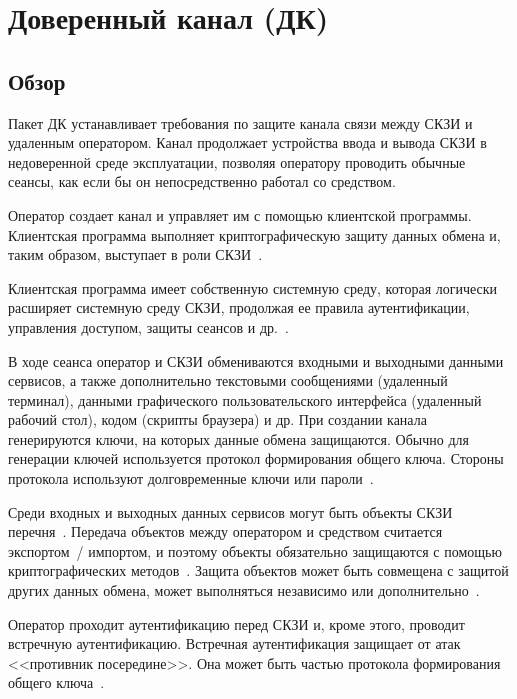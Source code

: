 \section{Доверенный канал (ДК)}\label{TC}

\subsection{Обзор}\label{TC.Intro}

Пакет ДК устанавливает требования по защите канала связи между СКЗИ и 
удаленным оператором. 
%
Канал продолжает устройства ввода и вывода СКЗИ в недоверенной среде 
эксплуатации, позволяя оператору проводить обычные сеансы,
как если бы он непосредственно работал со средством.

Оператор создает канал и управляет им с помощью клиентской программы. 
Клиентская программа выполняет криптографическую защиту данных обмена и, 
таким образом, выступает в роли СКЗИ~. 

Клиентская программа имеет собственную системную среду, которая логически 
расширяет системную среду СКЗИ, продолжая ее правила аутентификации,
управления доступом, защиты сеансов и др.~.

В ходе сеанса оператор и СКЗИ обмениваются входными и выходными данными 
сервисов, а также дополнительно текстовыми сообщениями (удаленный терминал),  
данными графического пользовательского интерфейса (удаленный рабочий стол),
кодом (скрипты браузера) и др.
%
При создании канала генерируются ключи, на которых данные обмена защищаются. 
Обычно для генерации ключей используется протокол формирования общего 
ключа. Стороны протокола используют долговременные ключи или 
пароли~.

Среди входных и выходных данных сервисов могут быть объекты СКЗИ 
перечня~. Передача объектов между оператором и средством 
считается экспортом~/ импортом, и поэтому объекты обязательно защищаются с помощью 
криптографических методов~. Защита объектов 
может быть совмещена с защитой других данных обмена, может выполняться 
независимо или дополнительно~.

Оператор проходит аутентификацию перед СКЗИ и, кроме этого, проводит встречную 
аутентификацию. Встречная аутентификация защищает от атак <<противник 
посередине>>. Она может быть частью протокола формирования общего 
ключа~.

